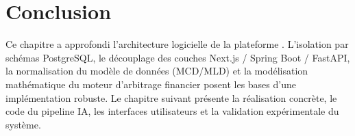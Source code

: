 \section{Conclusion}

Ce chapitre a approfondi l'architecture logicielle de la plateforme \projectShortTitle. L'isolation par schémas PostgreSQL, le découplage des couches Next.js / Spring Boot / FastAPI, la normalisation du modèle de données (MCD/MLD) et la modélisation mathématique du moteur d'arbitrage financier posent les bases d'une implémentation robuste. Le chapitre suivant présente la réalisation concrète, le code du pipeline IA, les interfaces utilisateurs et la validation expérimentale du système.

